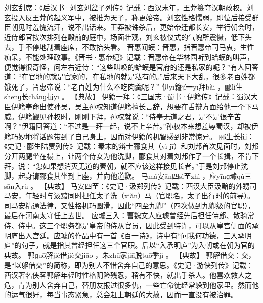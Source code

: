 \documentclass[12pt,UTF8]{ctexbook}
\begin{document}
刘玄刮席：《后汉书·刘玄刘盆子列传》记载：西汉末年，王莽篡夺汉朝政权。刘玄投入反王莽的起义军中，被推为天子，称更始帝。刘玄性格懦弱，即位后接受群臣朝见时羞愧流汗，说不出话来。王莽被诛杀后，更始帝迁都长安，举行朝会时，近侍郎官按次排列在殿前的庭中，场面壮观，刘玄被仪式的气魄所震慑，低下头去，手不停地刮着座席，不敢抬头看。
晋惠闻蟆：晋惠，指晋惠帝司马衷，生性痴呆，不能处理政事。《晋书·惠帝纪》记载：晋惠帝在华林园听到蛤蟆的叫声，便觉得很奇怪，问左右近侍：“这些叫唤的蛤蟆是官府的还是私家的呢？”有人回答道：“在官地的就是官家的，在私地的就是私有的。”后来天下大乱，很多老百姓都饿死了，晋惠帝说：“老百姓为什么不吃肉羹呢？”
伊yī籍jí一yī拜bài
，郦lì生shēnɡ长chánɡ揖yī
。
【典故】
伊籍一拜：《三国志·蜀书·伊籍传》记载：蜀汉大臣伊籍奉命出使孙吴，吴主孙权知道伊籍擅长言辞，想要在舌辩方面给他一个下马威。伊籍觐见孙权时，刚刚下拜，孙权就说：“侍奉无道之君，是不是很辛苦啊？”伊籍回答道：“不过是一拜一起，说不上辛苦。”孙权本来想羞辱蜀汉，却被伊籍巧妙地将话题带到了自己身上，因而对伊籍的机智感到非常惊异。
郦生长揖：《史记·郦生陆贾列传》记载：秦末的辩士郦食其（yì jī）和刘邦首次见面时，刘邦分开两腿坐在榻上，让两个侍女为他洗脚，郦食其对着刘邦作了一个长揖，不肯下拜，说：“您如果想消灭无道的秦朝，就不应该这样接见长者。”于是刘邦停止洗脚，起身请郦食其坐到上座，并向他道歉。
马mǎ安ān四sì至zhì
，应yīnɡ璩qú三sān入rù
。
【典故】
马安四至：《史记·汲郑列传》记载：西汉大臣汲黯的外甥司马安，年轻时与汲黯同时担任太子洗（xiǎn）马（官职名，太子出行时的前导）。司马安精通法律，又性格机巧圆滑，因此“四至九卿”（四次做到九卿级的官职），最后在河南太守任上去世。
应璩三入：曹魏文人应璩曾经先后担任侍郎、散骑常侍、侍中。这三个职务都是皇帝的侍从官员，因此受到特许，可以从皇宫侧面的承明庐出入宫廷。应璩的作品中有一首《百一诗》，诗中有“问我何功德，三入承明庐”的句子，就是指其曾经担任这三个官职。后以“入承明庐”为入朝或在朝为官的典故。
郭ɡuō解jiě借jiè交jiāo
，朱zhū家jiā脱tuō季jì
。
【典故】
郭解借交：交，是“以躯借交”的简称，即为别人不惜舍弃自己的意思。《史记·游侠列传》记载：西汉著名侠客郭解年轻时性格阴险残忍，稍有不快，就出手杀人。他喜欢救人之危，肯为别人舍弃自己，替朋友报过很多仇，一些亡命徒经常躲到他家里。然而他的运气很好，每当事态紧急，总会赶上朝廷的大赦，因而一直没有被治罪。
\end{document}
